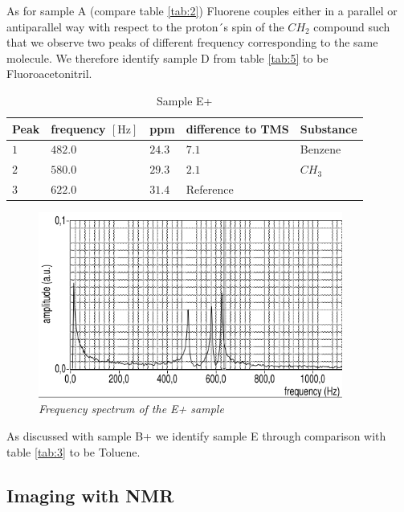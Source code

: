 \noindent
As for sample A (compare table \ref{tab:2}) Fluorene couples either in a parallel or antiparallel way with respect to the proton´s spin of the $CH_2$ compound such that we observe two peaks of different frequency corresponding to the same molecule. We therefore identify sample D from table \ref{tab:5} to be Fluoroacetonitril.\\
\begin{table}[h]
	\centering
	\begin{tabular}{lllll}
		\toprule
		Peak & frequency $\left[\mathrm{Hz}\right]$ & ppm & difference to TMS & Substance \\
		\midrule
		$ 1$ & $482.0$ & $24.3$ & $7.1$ & Benzene\\
		
		$ 2$ & $580.0$ & $29.3$ &$ 2.1$ & $CH_3$\\
		
		$ 3$ & $622.0$ &$31.4$ & Reference & \\
		\bottomrule
	\end{tabular}
	\caption{Sample E+}
	\label{tab:6}
\end{table}

\begin{figure}[h]
	\centering
	\includegraphics[width=100mm]{E+}
	\caption{\itshape Frequency spectrum of the E+ sample}
	\label{fig:10}
\end{figure}
\noindent
As discussed with sample B+ we identify sample E through comparison with table \ref{tab:3} to be Toluene.

\subsection{Imaging with NMR}
